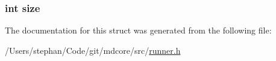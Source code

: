 \hypertarget{structrunner__fifo_a439227feff9d7f55384e8780cfc2eb82}{
\subsubsection[{size}]{\setlength{\rightskip}{0pt plus 5cm}int size}}\label{structrunner__fifo_a439227feff9d7f55384e8780cfc2eb82}


The documentation for this struct was generated from the following file\-:\begin{DoxyCompactItemize}
\item 
/\-Users/stephan/\-Code/git/mdcore/src/\hyperlink{runner_8h}{runner.\-h}\end{DoxyCompactItemize}
